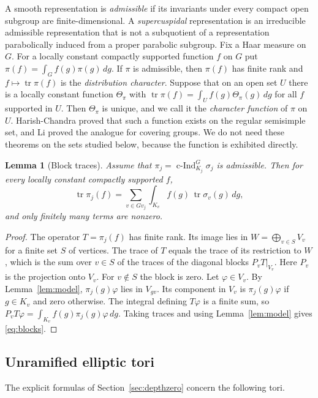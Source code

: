 \documentclass[12pt,letterpaper]{article}
\numberwithin{equation}{section}
\newtheorem{lemma}[theorem]{Lemma}
\theoremstyle{definition}
\theoremstyle{remark}
\newcommand{\cInd}{\operatorname{c-Ind}}
\newcommand{\tr}{\operatorname{tr}}
\begin{document}
A smooth representation is \emph{admissible} if its invariants under every compact open subgroup are finite-dimensional. A \emph{supercuspidal} representation is an irreducible admissible representation that is not a subquotient of a representation parabolically induced from a proper parabolic subgroup. Fix a Haar measure on $G$. For a locally constant compactly supported function $f$ on $G$ put $\pi(f)=\int_Gf(g)\pi(g)\,dg$. If $\pi$ is admissible, then $\pi(f)$ has finite rank and $f\mapsto\tr\pi(f)$ is the \emph{distribution character}. Suppose that on an open set $U$ there is a locally constant function $\Theta_\pi$ with $\tr\pi(f)=\int_Uf(g)\Theta_\pi(g)\,dg$ for all $f$ supported in $U$. Then $\Theta_\pi$ is unique, and we call it the \emph{character function} of $\pi$ on $U$. Harish-Chandra proved that such a function exists on the regular semisimple set, and Li \cite{Li12} proved the analogue for covering groups. We do not need these theorems on the sets studied below, because the function is exhibited directly.

\begin{lemma}[Block traces]\label{lem:blocks}
Assume that $\pi_j=\cInd_{K_j}^G\sigma_j$ is admissible. Then for every locally constant compactly supported $f$,
\begin{equation}\label{eq:blocks}
 \tr\pi_j(f)=\sum_{v\in Gv_j}\int_{K_v}f(g)\,\tr\sigma_v(g)\,dg ,
\end{equation}
and only finitely many terms are nonzero.
\end{lemma}
\begin{proof}
The operator $T=\pi_j(f)$ has finite rank. Its image lies in $W=\bigoplus_{v\in S}V_v$ for a finite set $S$ of vertices. The trace of $T$ equals the trace of its restriction to $W$, which is the sum over $v\in S$ of the traces of the diagonal blocks $P_vT|_{V_v}$. Here $P_v$ is the projection onto $V_v$. For $v\notin S$ the block is zero. Let $\varphi\in V_v$. By Lemma~\ref{lem:model}, $\pi_j(g)\varphi$ lies in $V_{gv}$. Its component in $V_v$ is $\pi_j(g)\varphi$ if $g\in K_v$ and zero otherwise. The integral defining $T\varphi$ is a finite sum, so $P_vT\varphi=\int_{K_v}f(g)\pi_j(g)\varphi\,dg$. Taking traces and using Lemma~\ref{lem:model} gives \eqref{eq:blocks}.
\end{proof}

\subsection{Unramified elliptic tori}
The explicit formulas of Section~\ref{sec:depthzero} concern the following tori.
\end{document}
